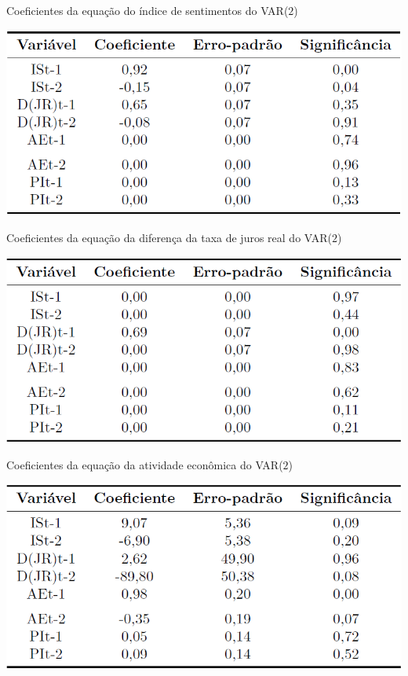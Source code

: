 \begin{apendicesenv}
\begin{table}[hbtp]
	\centering
	\caption{Coeficientes da equação do índice de sentimentos do VAR($2$)} \label{table:coef_IS_var_2}
	\includegraphics[scale = 0.50]{figuras/coeficientes_IS_var_2.PNG}
\end{table}

\begin{table}[hbtp]
	\centering
	\caption{Coeficientes da equação da diferença da taxa de juros real do VAR($2$)} \label{table:coef_JR_var_2}
	\includegraphics[scale = 0.50]{figuras/coeficientes_JR_var_2.PNG}
\end{table}

\begin{table}[hbtp]
	\centering
	\caption{Coeficientes da equação da atividade econômica do VAR($2$)} \label{table:coef_AE_var_2}
	\includegraphics[scale = 0.50]{figuras/coeficientes_AE_var_2.PNG}
\end{table}


\end{apendicesenv}
